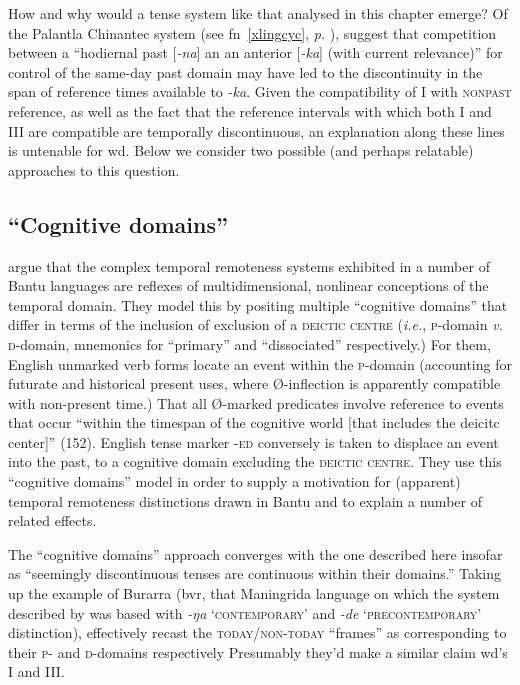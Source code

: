 How and why would a tense system like that analysed in this chapter emerge? Of the Palantla Chinantec system (see fn~\ref{xlingcyc}, \textit{p.} \pageref{xlingcyc}), \citet[104]{Bybee1994} suggest that competition between a ``hodiernal past [\textit{-na}] an an anterior [\textit{-ka}] (with current relevance)'' for control of the same-day past domain may have led to the discontinuity in the span of reference times available to \textit{-ka}. Given the compatibility of \gls{I} with \textsc{nonpast} reference, as well as the fact that the reference intervals with which both \gls{I} and \gls{III} are compatible are temporally discontinuous, an explanation along these lines is untenable for \gls{wd}. Below we consider two possible (and perhaps relatable) approaches to this question.


\subsection{``Cognitive domains''}

\citet[154, \textit{passim}]{Botne2008} argue that the complex temporal remoteness systems exhibited in a number of Bantu languages are reflexes of multidimensional, nonlinear conceptions of the temporal domain. They model this by positing multiple ``cognitive domains'' that differ in terms of the inclusion of exclusion of a \textsc{deictic centre} (\textit{i.e.}, \textsc{p-}domain \textit{v.} \textsc{d-}domain, mnemonics for ``primary'' and ``dissociated'' respectively.) For them, English unmarked verb forms locate an event within the \textsc{p}-domain (accounting for futurate and historical present uses, where Ø-inflection is apparently compatible with non-present time.) That all Ø-marked predicates involve reference to events that occur ``within the timespan of the cognitive world [that includes the deicitc center]'' (152). English tense marker \textsc{-ed} conversely is taken to displace an event into the past, to a cognitive domain excluding the \textsc{deictic centre}. They use this ``cognitive domains'' model in order to supply a motivation for (apparent) temporal remoteness distinctions drawn in Bantu and to explain a number of related effects.

The ``cognitive domains'' approach converges with the one described here insofar as ``seemingly discontinuous tenses are continuous within their domains.'' Taking up the example of Burarra (\gls{bvr}, that Maningrida language on which the system described by \citealt{Glasgow1964} was based with \textit{-ŋa} \textsc{`contemporary'} and \textit{-de} `\textsc{precontemporary}' distinction), \citeauthor{Botne2008} effectively recast the \textsc{today\slash{}non-today} ``frames'' as corresponding to their \textsc{p}- and \textsc{d-}domains respectively \citetext{\citeyear[209]{Botne2008}, see also Figure \ref{fig:botne}.} Presumably they'd make a similar claim \gls{wd}'s \gls{I} and \gls{III}.



